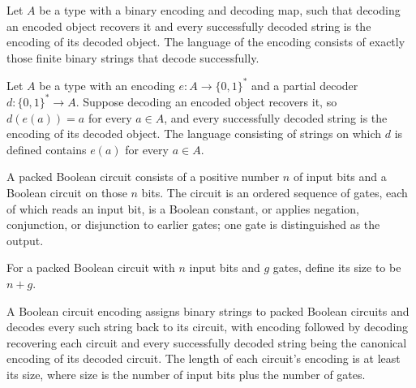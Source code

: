 \begin{definition}
\label{FABL.BinaryEncoding.language}
\leanok
{}
Let $A$ be a type with a binary encoding and decoding map, such that decoding an encoded
object recovers it and every successfully decoded string is the encoding of its decoded
object. The language of the encoding consists of exactly those finite binary strings
that decode successfully.
\end{definition}

\begin{theorem}
\label{FABL.BinaryEncoding.encode_mem_language}
\leanok
{}
Let $A$ be a type with an encoding $e:A\to\{0,1\}^*$ and a partial decoder
$d:\{0,1\}^*\to A$. Suppose decoding an encoded object recovers it, so $d(e(a))=a$ for
every $a\in A$, and every successfully decoded string is the encoding of its decoded
object. The language consisting of strings on which $d$ is defined contains $e(a)$ for
every $a\in A$.
\end{theorem}

\begin{definition}
\label{FABL.PackedBooleanCircuit}
\leanok
{}
A packed Boolean circuit consists of a positive number $n$ of input bits and a Boolean
circuit on those $n$ bits. The circuit is an ordered sequence of gates, each of which
reads an input bit, is a Boolean constant, or applies negation, conjunction, or
disjunction to earlier gates; one gate is distinguished as the output.
\end{definition}

\begin{definition}
\label{FABL.PackedBooleanCircuit.size}
\leanok
{}
For a packed Boolean circuit with $n$ input bits and $g$ gates, define its size to be
$n+g$.
\end{definition}

\begin{definition}
\label{FABL.BooleanCircuitEncoding}
\leanok
{}
A Boolean circuit encoding assigns binary strings to packed Boolean circuits and decodes
every such string back to its circuit, with encoding followed by decoding recovering
each circuit and every successfully decoded string being the canonical encoding of its
decoded circuit. The length of each circuit's encoding is at least its size, where size
is the number of input bits plus the number of gates.
\end{definition}

